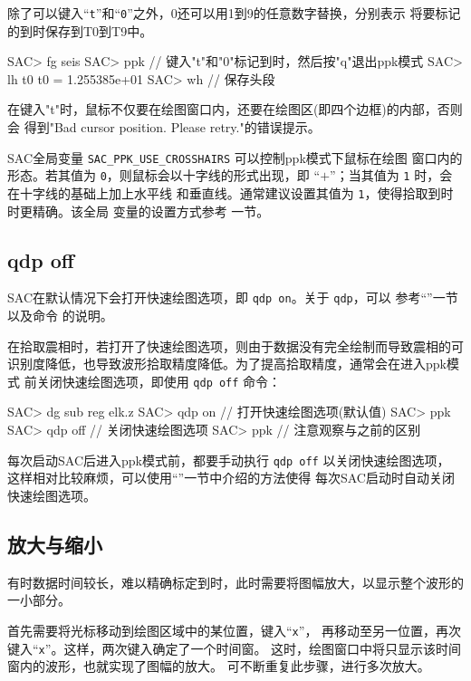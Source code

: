 除了可以键入``\texttt{t}''和``\texttt{0}''之外，0还可以用1到9的任意数字替换，分别表示
将要标记的到时保存到T0到T9中。

\begin{SACCode}
SAC> fg seis
SAC> ppk
// 键入"t"和"0"标记到时，然后按"q"退出ppk模式
SAC> lh t0
     t0 = 1.255385e+01
SAC> wh         // 保存头段
\end{SACCode}

\begin{note}
在键入"t"时，鼠标不仅要在绘图窗口内，还要在绘图区(即四个边框)的内部，否则会
得到"Bad cursor position. Please retry."的错误提示。
\end{note}

\begin{note}
SAC全局变量 \verb|SAC_PPK_USE_CROSSHAIRS| 可以控制ppk模式下鼠标在绘图
窗口内的形态。若其值为 \texttt{0}，则鼠标会以十字线的形式出现，即
``{\Large$+$}''；当其值为 \texttt{1} 时，会在十字线的基础上加上水平线
和垂直线。通常建议设置其值为 \texttt{1}，使得拾取到时时更精确。该全局
变量的设置方式参考  一节。
\end{note}

\subsection{qdp off}
SAC在默认情况下会打开快速绘图选项，即 \texttt{qdp on}。关于 \texttt{qdp}，可以
参考``''一节以及命令  的说明。

在拾取震相时，若打开了快速绘图选项，则由于数据没有完全绘制而导致震相的可
识别度降低，也导致波形拾取精度降低。为了提高拾取精度，通常会在进入ppk模式
前关闭快速绘图选项，即使用 \texttt{qdp off} 命令：
\begin{SACCode}
SAC> dg sub reg elk.z
SAC> qdp on     // 打开快速绘图选项(默认值)
SAC> ppk
SAC> qdp off    // 关闭快速绘图选项
SAC> ppk        // 注意观察与之前的区别
\end{SACCode}
每次启动SAC后进入ppk模式前，都要手动执行 \texttt{qdp off} 以关闭快速绘图选项，
这样相对比较麻烦，可以使用``''一节中介绍的方法使得
每次SAC启动时自动关闭快速绘图选项。

\subsection{放大与缩小}
有时数据时间较长，难以精确标定到时，此时需要将图幅放大，以显示整个波形的一小部分。

首先需要将光标移动到绘图区域中的某位置，键入``\texttt{x}''，
再移动至另一位置，再次键入``\texttt{x}''。这样，两次键入确定了一个时间窗。
这时，绘图窗口中将只显示该时间窗内的波形，也就实现了图幅的放大。
可不断重复此步骤，进行多次放大。

